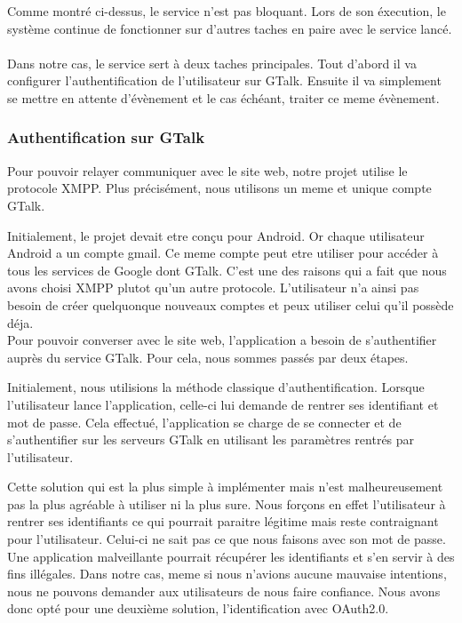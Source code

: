 Comme montré ci-dessus, le service n'est pas  bloquant. Lors de son éxecution, le système continue de 
fonctionner sur d'autres taches en paire avec le service lancé.
\\\\
Dans notre cas, le service sert à deux taches principales. Tout d'abord il va configurer l'authentification
de l'utilisateur sur GTalk. Ensuite il va simplement se mettre en attente d'évènement et le cas échéant, 
traiter ce meme évènement.




\subsubsection{Authentification sur GTalk}



Pour pouvoir relayer communiquer avec le site web, notre projet utilise le protocole XMPP. Plus 
précisément, nous utilisons un meme et unique compte GTalk. 

Initialement, le projet devait etre conçu pour Android. Or chaque utilisateur Android a un compte 
gmail. Ce meme compte peut etre utiliser pour accéder à tous les services de Google dont GTalk.
C'est une des raisons qui a fait que nous avons choisi XMPP plutot qu'un autre protocole. L'utilisateur
n'a ainsi pas besoin de créer quelquonque nouveaux comptes et peux utiliser celui qu'il possède déja.
\\


Pour pouvoir converser avec le site web, l'application a besoin de s'authentifier auprès du service
GTalk. Pour cela, nous sommes passés par deux étapes. 

Initialement, nous utilisions la méthode classique d'authentification. Lorsque l'utilisateur lance 
l'application, celle-ci lui demande de rentrer ses identifiant et mot de passe. Cela effectué, 
l'application se charge de se connecter et de s'authentifier sur les serveurs GTalk en utilisant les
paramètres rentrés par l'utilisateur.

Cette solution qui est la plus simple à implémenter mais n'est malheureusement pas la plus agréable
à utiliser ni la plus sure. Nous forçons en effet l'utilisateur à rentrer ses identifiants ce qui 
pourrait paraitre légitime mais reste contraignant pour l'utilisateur. Celui-ci ne sait pas ce que 
nous faisons avec son mot de passe. Une application malveillante pourrait récupérer les identifiants
et s'en servir à des fins illégales. Dans notre cas, meme si nous n'avions aucune mauvaise intentions,
nous ne pouvons demander aux utilisateurs de nous faire confiance. Nous avons donc opté pour une 
deuxième solution, l'identification avec OAuth2.0.

